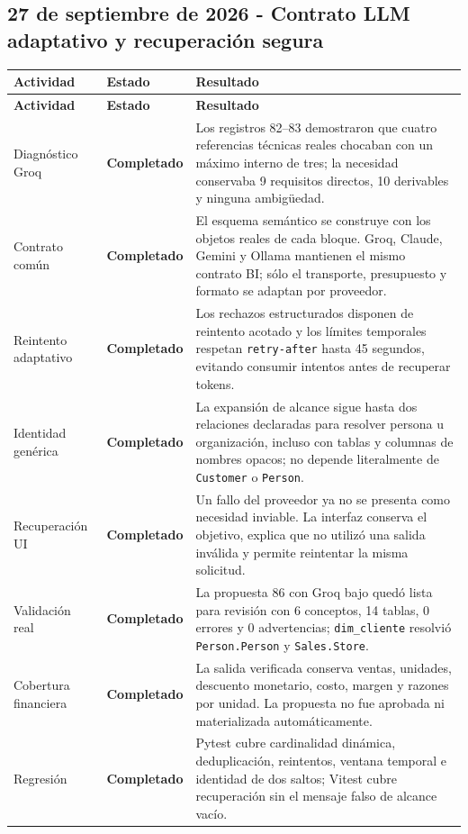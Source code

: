 \documentclass[11pt,letterpaper]{article}
\newcommand{\statusok}{\textcolor{deepgreen}{\textbf{Completado}}}
\newcommand{\file}[1]{\texttt{#1}}
\begin{document}
\subsection{27 de septiembre de 2026 - Contrato LLM adaptativo y recuperación segura}

\begin{longtable}{@{}p{}p{}p{}@{}}
  \toprule
  \textbf{Actividad} & \textbf{Estado} & \textbf{Resultado} \\
  \midrule
  \endfirsthead
  \toprule
  \textbf{Actividad} & \textbf{Estado} & \textbf{Resultado} \\
  \midrule
  \endhead
  Diagnóstico Groq & \statusok & Los registros 82--83 demostraron que cuatro referencias técnicas reales chocaban con un máximo interno de tres; la necesidad conservaba 9 requisitos directos, 10 derivables y ninguna ambigüedad. \\
  Contrato común & \statusok & El esquema semántico se construye con los objetos reales de cada bloque. Groq, Claude, Gemini y Ollama mantienen el mismo contrato BI; sólo el transporte, presupuesto y formato se adaptan por proveedor. \\
  Reintento adaptativo & \statusok & Los rechazos estructurados disponen de reintento acotado y los límites temporales respetan \file{retry-after} hasta 45 segundos, evitando consumir intentos antes de recuperar tokens. \\
  Identidad genérica & \statusok & La expansión de alcance sigue hasta dos relaciones declaradas para resolver persona u organización, incluso con tablas y columnas de nombres opacos; no depende literalmente de \file{Customer} o \file{Person}. \\
  Recuperación UI & \statusok & Un fallo del proveedor ya no se presenta como necesidad inviable. La interfaz conserva el objetivo, explica que no utilizó una salida inválida y permite reintentar la misma solicitud. \\
  Validación real & \statusok & La propuesta 86 con Groq bajo quedó lista para revisión con 6 conceptos, 14 tablas, 0 errores y 0 advertencias; \file{dim\_cliente} resolvió \file{Person.Person} y \file{Sales.Store}. \\
  Cobertura financiera & \statusok & La salida verificada conserva ventas, unidades, descuento monetario, costo, margen y razones por unidad. La propuesta no fue aprobada ni materializada automáticamente. \\
  Regresión & \statusok & Pytest cubre cardinalidad dinámica, deduplicación, reintentos, ventana temporal e identidad de dos saltos; Vitest cubre recuperación sin el mensaje falso de alcance vacío. \\
  \bottomrule
\end{longtable}
\end{document}
